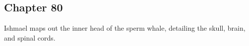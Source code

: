 \subsection{Chapter 80}

Ishmael maps out the inner head of the sperm whale, detailing the skull, brain,
and spinal cords.
